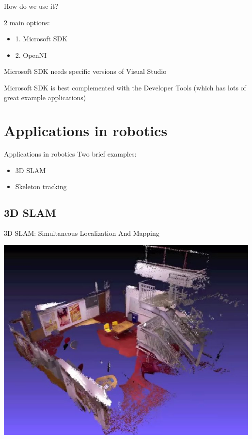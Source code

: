 \documentclass[compress]{beamer}
\begin{document}
\begin{frame}{How do we use it?}

        2 main options:

        \begin{itemize}

            \item
                  1. Microsoft SDK
            \item
                  2. OpenNI
        \end{itemize}

        Microsoft SDK needs specific versions of Visual Studio

        Microsoft SDK is best complemented with the Developer Tools (which has
        lots of great example applications)

\end{frame}

\section{Applications in robotics}

\begin{frame}{Applications in robotics}
    Two brief examples:

    \begin{itemize}
        \item 3D SLAM
        \item Skeleton tracking
    \end{itemize}
\end{frame}


\subsection{3D SLAM}
\begin{frame}{3D SLAM: Simultaneous Localization And Mapping}

    \begin{center}
        \includegraphics[width=\linewidth]{slam1}
    \end{center}
\end{frame}
\end{document}
